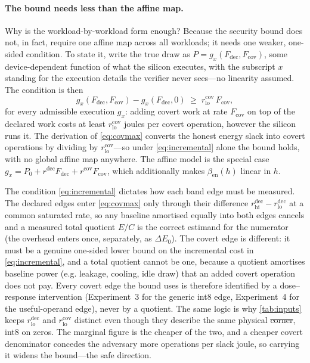 \documentclass{article}
\makeatletter
\theoremstyle{plain}
\theoremstyle{definition}
\theoremstyle{remark}
\providecommand{\DIFaddtex}[1]{{\protect\color{blue}\uwave{#1}}} %
\providecommand{\DIFdeltex}[1]{{\protect\color{red}\sout{#1}}} %
\providecommand{\DIFaddbegin}{} %
\providecommand{\DIFaddend}{} %
\providecommand{\DIFdelbegin}{} %
\providecommand{\DIFdelend}{} %
\providecommand{\DIFadd}[1]{\texorpdfstring{\DIFaddtex{#1}}{#1}} %
\providecommand{\DIFdel}[1]{\texorpdfstring{\DIFdeltex{#1}}{}} %
\providecommand{\DIFscaledelfig}{0.5}
\newlength{\DIFdelgraphicswidth} %
\newlength{\DIFdelgraphicsheight} %
\providecommand{\DIFaddincludegraphics}[2][]{{\color{blue}\fbox{\DIFOincludegraphics[#1]{#2}}}} %
\providecommand{\DIFdelincludegraphics}[2][]{%
\sbox{\DIFdelgraphicsbox}{\DIFOincludegraphics[#1]{#2}}%
\settoboxwidth{\DIFdelgraphicswidth}{\DIFdelgraphicsbox} %
\settoboxtotalheight{\DIFdelgraphicsheight}{\DIFdelgraphicsbox} %
\scalebox{\DIFscaledelfig}{%
\parbox[b]{\DIFdelgraphicswidth}{\usebox{\DIFdelgraphicsbox}\\[-\baselineskip] \rule{\DIFdelgraphicswidth}{0em}}\llap{\resizebox{\DIFdelgraphicswidth}{\DIFdelgraphicsheight}{%
\setlength{\unitlength}{\DIFdelgraphicswidth}%
\begin{picture}(1,1)%
\thicklines\linethickness{2pt} %
{\color[rgb]{1,0,0}\put(0,0){\framebox(1,1){}}}%
{\color[rgb]{1,0,0}\put(0,0){\line( 1,1){1}}}%
{\color[rgb]{1,0,0}\put(0,1){\line(1,-1){1}}}%
\end{picture}%
}\hspace*{3pt}}} %
} %
\DeclareRobustCommand{\DIFaddbegin}{\DIFOaddbegin \let\includegraphics\DIFaddincludegraphics} %
\DeclareRobustCommand{\DIFaddend}{\DIFOaddend \let\includegraphics\DIFOincludegraphics} %
\DeclareRobustCommand{\DIFdelbegin}{\DIFOdelbegin \let\includegraphics\DIFdelincludegraphics} %
\DeclareRobustCommand{\DIFdelend}{\DIFOaddend \let\includegraphics\DIFOincludegraphics} %
\let\sout@orig\sout %
\renewcommand{\sout}[1]{\ifmmode\text{\sout@orig{\ensuremath{#1}}}\else\sout@orig{#1}\fi} %
\makeatother
\begin{document}
\paragraph{The bound needs less than the affine map.}
\label{app:estimands}
Why is the workload-by-workload form enough? Because the security bound does
not, in fact, require one affine map across all workloads; it needs one
weaker, one-sided condition. To state it, write the true draw as
$P = g_x(F_{\mathrm{dec}}, F_{\mathrm{cov}})$, some device-dependent function
of what the silicon executes, with the subscript $x$ standing for the
execution details the verifier never sees---no linearity assumed. The
condition is then
\begin{equation}
	g_x(F_{\mathrm{dec}}, F_{\mathrm{cov}}) - g_x(F_{\mathrm{dec}}, 0)
	\;\ge\; r_{\mathrm{lo}}^{\mathrm{cov}}\,F_{\mathrm{cov}},
	\label{eq:incremental}
\end{equation}
for every admissible execution $g_x$: adding covert work at rate
$F_{\mathrm{cov}}$ on top of the declared work costs at least
$r_{\mathrm{lo}}^{\mathrm{cov}}$ joules per covert operation, however the
silicon runs it. The derivation
of \cref{eq:covmax} converts the honest energy slack into covert operations by
dividing by $r_{\mathrm{lo}}^{\mathrm{cov}}$---so under \cref{eq:incremental}
alone the bound holds, with no global affine map anywhere. The affine model is
the special case
$g_x = P_0 + r^{\mathrm{dec}}F_{\mathrm{dec}} + r^{\mathrm{cov}}F_{\mathrm{cov}}$,
which additionally makes $\beta_{\mathrm{en}}(h)$ linear in $h$.

The condition \cref{eq:incremental} dictates how each band edge must be measured. The declared edges
enter \cref{eq:covmax} only through their difference
$r_{\mathrm{hi}}^{\mathrm{dec}} - r_{\mathrm{lo}}^{\mathrm{dec}}$ at a common
saturated rate, so any baseline amortised equally into both edges cancels and
a measured total quotient $E/C$ is the correct estimand for the numerator (the
overhead enters once, separately, as $\Delta E_0$). The covert edge is
different: it must be a genuine one-sided lower bound on the incremental cost
in \cref{eq:incremental}, and a total quotient cannot be one, because a
quotient amortises baseline power (e.g. leakage, cooling, idle draw) that an
added covert operation does not pay. Every covert edge the bound uses is
therefore identified by a dose--response intervention (Experiment~3 for the
generic int8 edge, Experiment~4 for the useful-operand edge), never by a
quotient. The same logic is why \cref{tab:inputs} keeps
$r_{\mathrm{lo}}^{\mathrm{dec}}$ and $r_{\mathrm{lo}}^{\mathrm{cov}}$ distinct
even though they describe the same physical \DIFdelbegin \DIFdel{corner}\DIFdelend \DIFaddbegin \DIFadd{case}\DIFaddend , int8 on zeros. The marginal figure is the
cheaper of the two, and a cheaper covert denominator concedes the adversary
more operations per slack joule, so carrying it widens the bound---the safe
direction.
\end{document}
